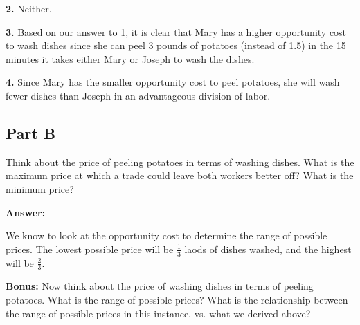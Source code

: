 \documentclass[12pt]{article}
\begin{document}
\medskip

\textbf{2.} Neither.

\medskip

\textbf{3.} Based on our answer to 1, it is clear that Mary has a higher opportunity cost to wash dishes since she can peel 3 pounds of potatoes (instead of 1.5) in the 15 minutes it takes either Mary or Joseph to wash the dishes.

\medskip

\textbf{4.} Since Mary has the smaller opportunity cost to peel potatoes, she will wash fewer dishes than Joseph in an advantageous division of labor.

\subsection*{Part B}
Think about the price of peeling potatoes in terms of washing dishes. What is the maximum price at which a trade could leave both workers better off? What is the minimum price?

\medskip

\textbf{Answer:}

We know to look at the opportunity cost to determine the range of possible prices. The lowest possible price will be $\frac{1}{3}$ laods of dishes washed, and the highest will be $\frac{2}{3}$.

\medskip

\textbf{Bonus:} Now think about the price of washing dishes in terms of peeling potatoes. What is the range of possible prices? What is the relationship between the range of possible prices in this instance, vs. what we derived above?
\end{document}
